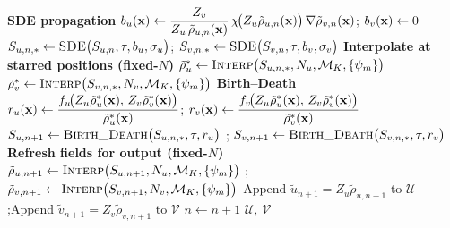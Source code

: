 \documentclass[a4paper,fleqn]{cas-sc}
\theoremstyle{definition}
\theoremstyle{remark}
\begin{document}
\begin{algorithm}
\begin{algorithmic}
    \State \textbf{SDE propagation}
    \State $b_u(\mathbf{x}) \gets \dfrac{Z_v}{Z_u\,\tilde\rho_{u,n}(\mathbf{x})}\,\chi\!\big(Z_u\tilde\rho_{u,n}(\mathbf{x})\big)\,\nabla\tilde\rho_{v,n}(\mathbf{x})$; $b_v(\mathbf{x}) \gets 0$
    \State $S_{u,n,*} \gets \textsc{SDE}\big(S_{u,n},\tau,b_u,\sigma_u\big)$; $S_{v,n,*} \gets \textsc{SDE}\big(S_{v,n},\tau,b_v,\sigma_v\big)$
    \State \textbf{Interpolate at starred positions (fixed-$N$)}
    \State $\tilde\rho_u^* \gets \textsc{Interp}\big(S_{u,n,*},N_u,\mathcal M_K,\{\psi_m\}\big)$
    \State $\tilde\rho_v^* \gets \textsc{Interp}\big(S_{v,n,*},N_v,\mathcal M_K,\{\psi_m\}\big)$
    \State \textbf{Birth--Death}
    \State $r_u(\mathbf{x}) \gets \dfrac{f_u\!\big(Z_u\tilde\rho_u^*(\mathbf{x}),\,Z_v\tilde\rho_v^*(\mathbf{x})\big)}{\tilde\rho_u^*(\mathbf{x})}$; $r_v(\mathbf{x}) \gets \dfrac{f_v\!\big(Z_u\tilde\rho_u^*(\mathbf{x}),\,Z_v\tilde\rho_v^*(\mathbf{x})\big)}{\tilde\rho_v^*(\mathbf{x})}$
    \State $S_{u,n+1} \gets \textsc{Birth\_Death}\big(S_{u,n,*},\tau,r_u\big)$
    ; $S_{v,n+1} \gets \textsc{Birth\_Death}\big(S_{v,n,*},\tau,r_v\big)$
    \State \textbf{Refresh fields for output (fixed-$N$)}
    \State $\tilde\rho_{u,n+1} \gets \textsc{Interp}\big(S_{u,n+1},N_u,\mathcal M_K,\{\psi_m\}\big)$
    ; $\tilde\rho_{v,n+1} \gets \textsc{Interp}\big(S_{v,n+1},N_v,\mathcal M_K,\{\psi_m\}\big)$
    \State Append $\tilde u_{n+1}=Z_u\tilde\rho_{u,n+1}$ to $\mathcal U$;\quad Append $\tilde v_{n+1}=Z_v\tilde\rho_{v,n+1}$ to $\mathcal V$
    \State $n\gets n+1$
  \EndWhile
  \State \Return $\mathcal U,\ \mathcal V$
\EndProcedure
\end{algorithmic}
\end{algorithm}




\end{document}
